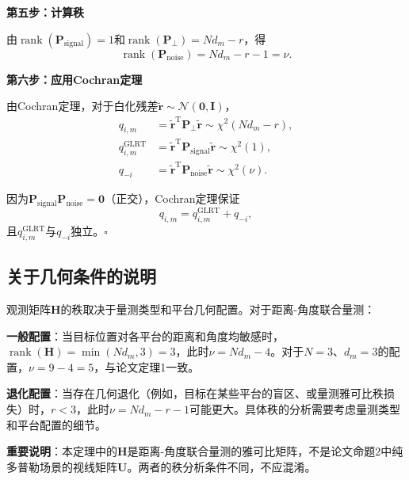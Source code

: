 \documentclass[UTF8,a4paper,zihao=-4]{ctexart}
\begin{document}
\noindent\textbf{第五步：计算秩}\par

由\(\operatorname{rank}(\mathbf{P}_{\text{signal}})=1\)和\(\operatorname{rank}(\mathbf{P}_{\perp})=Nd_m-r\)，得
\begin{equation}
\operatorname{rank}(\mathbf{P}_{\text{noise}}) = Nd_m - r - 1 = \nu.
\end{equation}

\noindent\textbf{第六步：应用Cochran定理}\par

由Cochran定理\cite{cochran1934}，对于白化残差\(\widetilde{\mathbf{r}}\sim\mathcal{N}(\mathbf{0},\mathbf{I})\)，
\begin{align}
q_{i,m} &= \widetilde{\mathbf{r}}^{\mathrm{T}}\mathbf{P}_{\perp}\widetilde{\mathbf{r}} \sim \chi^2(Nd_m-r), \\
q^{\mathrm{GLRT}}_{i,m} &= \widetilde{\mathbf{r}}^{\mathrm{T}}\mathbf{P}_{\text{signal}}\widetilde{\mathbf{r}} \sim \chi^2(1), \\
q_{-i} &= \widetilde{\mathbf{r}}^{\mathrm{T}}\mathbf{P}_{\text{noise}}\widetilde{\mathbf{r}} \sim \chi^2(\nu).
\end{align}

因为\(\mathbf{P}_{\text{signal}}\mathbf{P}_{\text{noise}}=\mathbf{0}\)（正交），Cochran定理保证
\begin{equation}
q_{i,m} = q^{\mathrm{GLRT}}_{i,m} + q_{-i},
\end{equation}
且\(q^{\mathrm{GLRT}}_{i,m}\)与\(q_{-i}\)独立。\(\square\)

\subsection{关于几何条件的说明}

观测矩阵\(\mathbf{H}\)的秩取决于量测类型和平台几何配置。对于距离-角度联合量测：

\textbf{一般配置}：当目标位置对各平台的距离和角度均敏感时，\(\operatorname{rank}(\mathbf{H})=\min(Nd_m,3)=3\)，此时\(\nu=Nd_m-4\)。对于\(N=3\)、\(d_m=3\)的配置，\(\nu=9-4=5\)，与论文定理1一致。

\textbf{退化配置}：当存在几何退化（例如，目标在某些平台的盲区、或量测雅可比秩损失）时，\(r<3\)，此时\(\nu=Nd_m-r-1\)可能更大。具体秩的分析需要考虑量测类型和平台配置的细节。

\textbf{重要说明}：本定理中的\(\mathbf{H}\)是距离-角度联合量测的雅可比矩阵，不是论文命题2中纯多普勒场景的视线矩阵\(\mathbf{U}\)。两者的秩分析条件不同，不应混淆。
\end{document}
